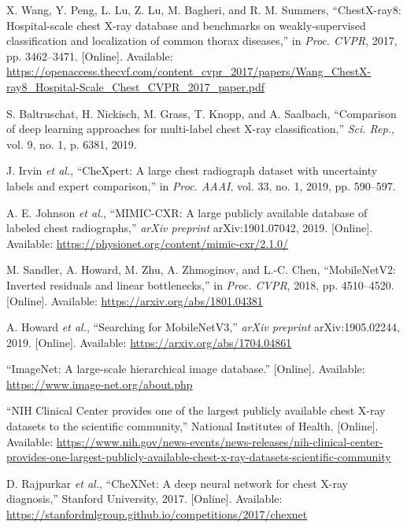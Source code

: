 \documentclass[12pt]{article}
\begin{document}
\begin{thebibliography}{99}
X. Wang, Y. Peng, L. Lu, Z. Lu, M. Bagheri, and R. M. Summers, “ChestX-ray8: Hospital-scale chest X-ray database and benchmarks on weakly-supervised classification and localization of common thorax diseases,” in \textit{Proc. CVPR}, 2017, pp. 3462–3471. [Online]. Available: \url{https://openaccess.thecvf.com/content_cvpr_2017/papers/Wang_ChestX-ray8_Hospital-Scale_Chest_CVPR_2017_paper.pdf}

S. Baltruschat, H. Nickisch, M. Grass, T. Knopp, and A. Saalbach, “Comparison of deep learning approaches for multi-label chest X-ray classification,” \textit{Sci. Rep.}, vol. 9, no. 1, p. 6381, 2019.

J. Irvin \textit{et al.}, “CheXpert: A large chest radiograph dataset with uncertainty labels and expert comparison,” in \textit{Proc. AAAI}, vol. 33, no. 1, 2019, pp. 590–597.

A. E. Johnson \textit{et al.}, “MIMIC-CXR: A large publicly available database of labeled chest radiographs,” \textit{arXiv preprint} arXiv:1901.07042, 2019. [Online]. Available: \url{https://physionet.org/content/mimic-cxr/2.1.0/}

M. Sandler, A. Howard, M. Zhu, A. Zhmoginov, and L.-C. Chen, “MobileNetV2: Inverted residuals and linear bottlenecks,” in \textit{Proc. CVPR}, 2018, pp. 4510–4520. [Online]. Available: \url{https://arxiv.org/abs/1801.04381}

A. Howard \textit{et al.}, “Searching for MobileNetV3,” \textit{arXiv preprint} arXiv:1905.02244, 2019. [Online]. Available: \url{https://arxiv.org/abs/1704.04861}

“ImageNet: A large-scale hierarchical image database.” [Online]. Available: \url{https://www.image-net.org/about.php}

“NIH Clinical Center provides one of the largest publicly available chest X-ray datasets to the scientific community,” National Institutes of Health. [Online]. Available: \url{https://www.nih.gov/news-events/news-releases/nih-clinical-center-provides-one-largest-publicly-available-chest-x-ray-datasets-scientific-community}

D. Rajpurkar \textit{et al.}, “CheXNet: A deep neural network for chest X-ray diagnosis,” Stanford University, 2017. [Online]. Available: \url{https://stanfordmlgroup.github.io/competitions/2017/chexnet}


\end{thebibliography}
\end{document}
